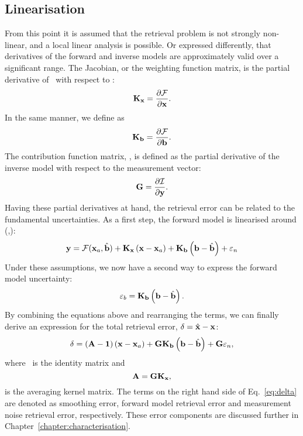 \subsection{Linearisation}
%
From this point it is assumed that the retrieval problem is not strongly
non-linear, and a local linear analysis is possible. Or expressed differently,
that derivatives of the forward and inverse models are approximately valid over
a significant range. The Jacobian, or the weighting function matrix, is the
partial derivative of \FrwMdl\ with respect to \SttVct:
\begin{equation}
  \label{eq:kx}
  \mathbf{K}_{\mathbf{x}} = \frac{\partial\mathcal{F}}{\partial\mathbf{x}}.
\end{equation}
In the same manner, we define \aWfnMtr{\FrwMdlVct} as
\begin{equation}
  \label{eq:kb}
  \mathbf{K}_{\mathbf{b}} = \frac{\partial\mathcal{F}}{\partial\mathbf{b}}.
\end{equation}
The contribution function matrix, \CtrFncMtr, is defined as the partial
derivative of the inverse model with respect to the measurement vector:
\begin{equation}
  \label{eq:g}
  \mathbf{G} = \frac{\partial\mathcal{I}}{\partial\mathbf{y}}.
\end{equation}
Having these partial derivatives at hand, the retrieval error can be related
to the fundamental uncertainties. As a first step, the forward model is
linearised around (,\FrwMdlVctHat):
\begin{equation}
  \label{eq:fmodel3}
  \mathbf{y} = \mathcal{F}(\mathbf{x}_{a},\hat{\mathbf{b}}) + 
  \mathbf{K}_{\mathbf{x}}\left(\mathbf{x}-\mathbf{x}_{a}\right) +
  \mathbf{K}_{\mathbf{b}}\left(\mathbf{b}-\hat{\mathbf{b}}\right) +
  \varepsilon_n
\end{equation}
Under these assumptions, we now have a second way to express the forward
model uncertainty:
\begin{equation}
  \varepsilon_b = \mathbf{K}_{\mathbf{b}}\left(\mathbf{b}-\hat{\mathbf{b}}\right).
\end{equation}
By combining the equations above and rearranging the terms, we can finally
derive an expression for the total retrieval error, $\delta = \hat{\mathbf{x}} - \mathbf{x}$:
\begin{equation}
  \label{eq:delta}
  \delta =  \left(\mathbf{A}-\mathbf{1}\right)
    \left(\mathbf{x}-\mathbf{x}_{a}\right) + 
    \mathbf{G}\mathbf{K}_{\mathbf{b}}\left(\mathbf{b}-\hat{\mathbf{b}}\right) +
    \mathbf{G}\varepsilon_n,
\end{equation}
where \IdnMtr\ is the identity matrix and
\begin{equation}
  \label{eq:A}
  \mathbf{A} = \mathbf{G}\mathbf{K}_{\mathbf{x}},
\end{equation}
is the averaging kernel matrix. The terms on the right hand side of
Eq.~\ref{eq:delta} are denoted as smoothing error, forward model retrieval
error and measurement noise retrieval error, respectively. These error
components are discussed further in Chapter~\ref{chapter:characterisation}.


